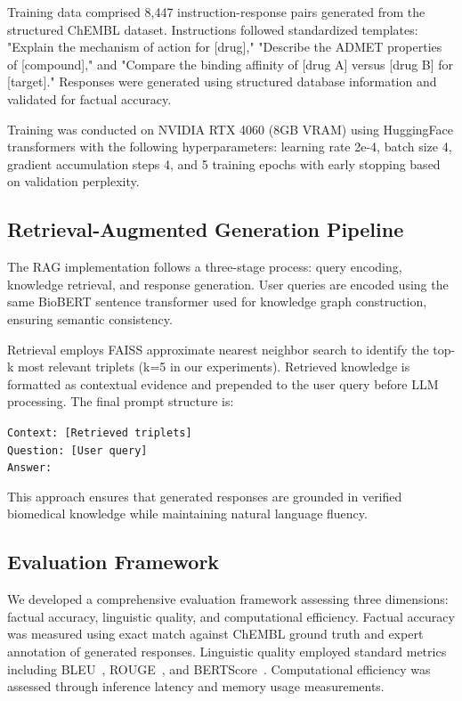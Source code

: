 \documentclass[conference]{IEEEtran}
\begin{document}
Training data comprised 8,447 instruction-response pairs generated from the structured ChEMBL dataset. Instructions followed standardized templates: "Explain the mechanism of action for [drug]," "Describe the ADMET properties of [compound]," and "Compare the binding affinity of [drug A] versus [drug B] for [target]." Responses were generated using structured database information and validated for factual accuracy.

Training was conducted on NVIDIA RTX 4060 (8GB VRAM) using HuggingFace transformers with the following hyperparameters: learning rate 2e-4, batch size 4, gradient accumulation steps 4, and 5 training epochs with early stopping based on validation perplexity.

\subsection{Retrieval-Augmented Generation Pipeline}

The RAG implementation follows a three-stage process: query encoding, knowledge retrieval, and response generation. User queries are encoded using the same BioBERT sentence transformer used for knowledge graph construction, ensuring semantic consistency.

Retrieval employs FAISS approximate nearest neighbor search to identify the top-k most relevant triplets (k=5 in our experiments). Retrieved knowledge is formatted as contextual evidence and prepended to the user query before LLM processing. The final prompt structure is:

\texttt{Context: [Retrieved triplets]}\\
\texttt{Question: [User query]}\\
\texttt{Answer:}

This approach ensures that generated responses are grounded in verified biomedical knowledge while maintaining natural language fluency.

\subsection{Evaluation Framework}

We developed a comprehensive evaluation framework assessing three dimensions: factual accuracy, linguistic quality, and computational efficiency. Factual accuracy was measured using exact match against ChEMBL ground truth and expert annotation of generated responses. Linguistic quality employed standard metrics including BLEU~\cite{papineni2002bleu}, ROUGE~\cite{lin2004rouge}, and BERTScore~\cite{zhang2019bertscore}. Computational efficiency was assessed through inference latency and memory usage measurements.
\end{document}
